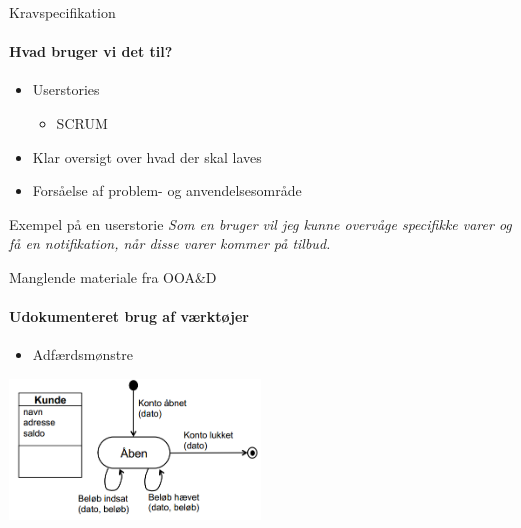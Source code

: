 \begin{frame}{Kravspecifikation}
	\framesubtitle{Hvad bruger vi det til?}
	\begin{itemize} 
    	\item Userstories
    	\begin{itemize}
    		\item SCRUM
    	\end{itemize}
    	\item Klar oversigt over hvad der skal laves
    	\item Forsåelse af problem- og anvendelsesområde
  	\end{itemize}
    \begin{beamerboxesrounded}[upper=headerCol,lower=bodyCol,shadow=true]{Exempel på en userstorie}
    \textit{Som en bruger vil jeg kunne overvåge specifikke varer og få en notifikation, når disse
varer kommer på tilbud.}
    \end{beamerboxesrounded}

\end{frame}
\begin{frame}{Manglende materiale fra OOA\&D}
	\framesubtitle{Udokumenteret brug af værktøjer}
	\begin{itemize} 
    \item Adfærdsmønstre
  \end{itemize}
  	 \vspace{4 mm}

  \includegraphics[width=0.5\textwidth]{images/adfaersmoenster.PNG}
\end{frame}